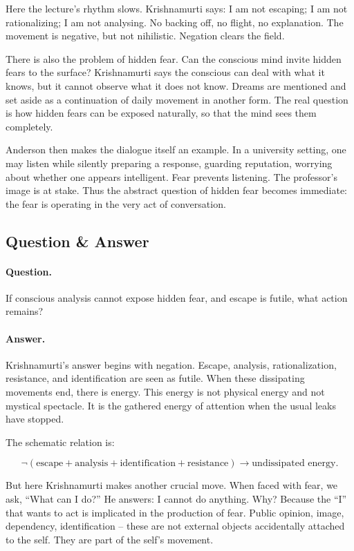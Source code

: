 Here the lecture's rhythm slows. Krishnamurti says: I am not escaping; I am not rationalizing; I am not analysing. No backing off, no flight, no explanation. The movement is negative, but not nihilistic. Negation clears the field.

There is also the problem of hidden fear. Can the conscious mind invite hidden fears to the surface? Krishnamurti says the conscious can deal with what it knows, but it cannot observe what it does not know. Dreams are mentioned and set aside as a continuation of daily movement in another form. The real question is how hidden fears can be exposed naturally, so that the mind sees them completely.

Anderson then makes the dialogue itself an example. In a university setting, one may listen while silently preparing a response, guarding reputation, worrying about whether one appears intelligent. Fear prevents listening. The professor's image is at stake. Thus the abstract question of hidden fear becomes immediate: the fear is operating in the very act of conversation.

\subsection{Question \& Answer}

\paragraph{Question.}
If conscious analysis cannot expose hidden fear, and escape is futile, what action remains?

\paragraph{Answer.}
Krishnamurti's answer begins with negation. Escape, analysis, rationalization, resistance, and identification are seen as futile. When these dissipating movements end, there is energy. This energy is not physical energy and not mystical spectacle. It is the gathered energy of attention when the usual leaks have stopped.

The schematic relation is:

\begin{equation}
\neg(\text{escape}+\text{analysis}+\text{identification}+\text{resistance})
\longrightarrow
\text{undissipated energy}.
\end{equation}

But here Krishnamurti makes another crucial move. When faced with fear, we ask, ``What can I do?'' He answers: I cannot do anything. Why? Because the ``I'' that wants to act is implicated in the production of fear. Public opinion, image, dependency, identification -- these are not external objects accidentally attached to the self. They are part of the self's movement.

